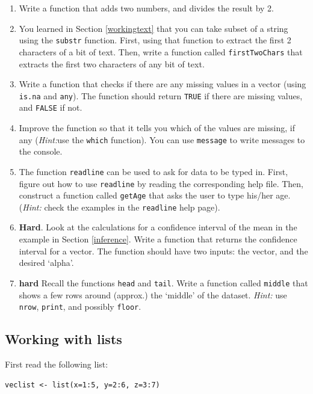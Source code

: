 \documentclass[]{book}
\begin{document}
\begin{enumerate}
\def\labelenumi{\arabic{enumi}.}
\item
  Write a function that adds two numbers, and divides the result by 2.
\item
  You learned in Section \ref{workingtext} that you can take subset of a string using the \texttt{substr} function. First, using that function to extract the first 2 characters of a bit of text. Then, write a function called \texttt{firstTwoChars} that extracts the first two characters of any bit of text.
\item
  Write a function that checks if there are any missing values in a vector (using \texttt{is.na} and \texttt{any}). The function should return \texttt{TRUE} if there are missing values, and \texttt{FALSE} if not.
\item
  Improve the function so that it tells you which of the values are missing, if any (\emph{Hint:}use the \texttt{which} function). You can use \texttt{message} to write messages to the console.
\item
  The function \texttt{readline} can be used to ask for data to be typed in. First, figure out how to use \texttt{readline} by reading the corresponding help file. Then, construct a function called \texttt{getAge} that asks the user to type his/her age. (\emph{Hint:} check the examples in the \texttt{readline} help page).
\item
  \textbf{Hard}. Look at the calculations for a confidence interval of the mean in the example in Section \ref{inference}. Write a function that returns the confidence interval for a vector. The function should have two inputs: the vector, and the desired `alpha'.
\item
  \textbf{hard} Recall the functions \texttt{head} and \texttt{tail}. Write a function called \texttt{middle} that shows a few rows around (approx.) the `middle' of the dataset. \emph{Hint:} use \texttt{nrow}, \texttt{print}, and possibly \texttt{floor}.
\end{enumerate}

\hypertarget{working-with-lists}{%
\subsection{Working with lists}\label{working-with-lists}}

First read the following list:

\begin{verbatim}
veclist <- list(x=1:5, y=2:6, z=3:7)
\end{verbatim}
\end{document}
